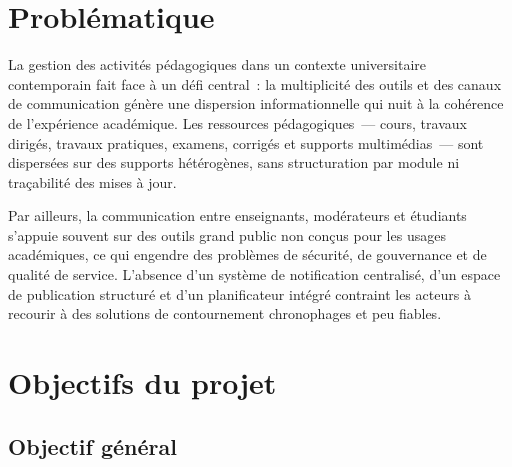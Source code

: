 ﻿\documentclass[12pt,a4paper,oneside]{report}
\begin{document}
\section{Probl\'ematique}
\label{sec:problematique}

La gestion des activit\'es p\'edagogiques dans un contexte universitaire contemporain fait face \`a un d\'efi central~: la multiplicit\'e des outils et des canaux de communication g\'en\`ere une dispersion informationnelle qui nuit \`a la coh\'erence de l'exp\'erience acad\'emique. Les ressources p\'edagogiques~--- cours, travaux dirig\'es, travaux pratiques, examens, corrig\'es et supports multim\'edias~--- sont dispers\'ees sur des supports h\'et\'erog\`enes, sans structuration par module ni tra\c{c}abilit\'e des mises \`a jour.

Par ailleurs, la communication entre enseignants, mod\'erateurs et \'etudiants s'appuie souvent sur des outils grand public non con\c{c}us pour les usages acad\'emiques, ce qui engendre des probl\`emes de s\'ecurit\'e, de gouvernance et de qualit\'e de service. L'absence d'un syst\`eme de notification centralis\'e, d'un espace de publication structur\'e et d'un planificateur int\'egr\'e contraint les acteurs \`a recourir \`a des solutions de contournement chronophages et peu fiables.

\medskip
\noindent{}
\medskip

\section{Objectifs du projet}
\label{sec:objectifs}

\subsection{Objectif g\'en\'eral}
\end{document}
